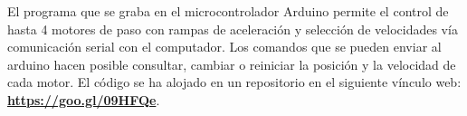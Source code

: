 El programa que se graba en el microcontrolador Arduino permite el
control de hasta 4 motores de paso con rampas de aceleración y
selección de velocidades vía comunicación serial con el computador. 
Los comandos que se pueden enviar al arduino hacen posible consultar,
cambiar o reiniciar la posición y la velocidad de cada motor.
El código se ha alojado en un repositorio en el siguiente vínculo web:
\\
\hspace*{\fill}\href{https://goo.gl/09HFQe}{\textbf{https://goo.gl/09HFQe}}.\hspace*{\fill}\\

